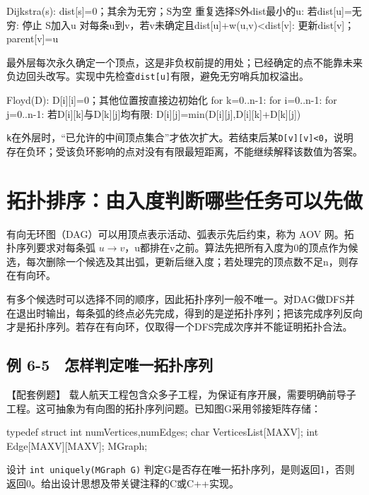 \begin{codeblock}[language={}]
Dijkstra(s):
    dist[s]=0；其余为无穷；S为空
    重复选择S外dist最小的u:
        若dist[u]=无穷: 停止
        S加入u
        对每条u到v，若v未确定且dist[u]+w(u,v)<dist[v]:
            更新dist[v]；parent[v]=u
\end{codeblock}

最外层每次永久确定一个顶点，这是非负权前提的用处；已经确定的点不能靠未来负边回头改写。实现中先检查\texttt{dist[u]}有限，避免无穷哨兵加权溢出。

\begin{codeblock}[language={}]
Floyd(D):
    D[i][i]=0；其他位置按直接边初始化
    for k=0..n-1:
        for i=0..n-1:
            for j=0..n-1:
                若D[i][k]与D[k][j]均有限:
                    D[i][j]=min(D[i][j],D[i][k]+D[k][j])
\end{codeblock}

\texttt{k}在外层时，``已允许的中间顶点集合''才依次扩大。若结束后某\texttt{D[v][v]<\allowbreak{}0}，说明存在负环；受该负环影响的点对没有有限最短距离，不能继续解释该数值为答案。

\section{拓扑排序：由入度判断哪些任务可以先做}\label{DS06-08}

有向无环图（DAG）可以用顶点表示活动、弧表示先后约束，称为 AOV 网。拓扑序列要求对每条弧 \(u\to v\)，u都排在v之前。算法先把所有入度为0的顶点作为候选，每次删除一个候选及其出弧，更新后继入度；若处理完的顶点数不足n，则存在有向环。

有多个候选时可以选择不同的顺序，因此拓扑序列一般不唯一。对DAG做DFS并在退出时输出，每条弧的终点必先完成，得到的是逆拓扑序列；把该完成序列反向才是拓扑序列。若存在有向环，仅取得一个DFS完成次序并不能证明拓扑合法。

\subsection{例 6-5　怎样判定唯一拓扑序列}\label{DS06-ex5}

\begin{example}[配套案例]

【配套例题】 载人航天工程包含众多子工程，为保证有序开展，需要明确前导子工程。这可抽象为有向图的拓扑序列问题。已知图G采用邻接矩阵存储：

\begin{codeblock}[language=C]
typedef struct {
    int numVertices,numEdges;
    char VerticesList[MAXV];
    int Edge[MAXV][MAXV];
} MGraph;
\end{codeblock}

设计 \texttt{int uniquely(\allowbreak{}MGraph G)\allowbreak{}} 判定G是否存在唯一拓扑序列，是则返回1，否则返回0。给出设计思想及带关键注释的C或C++实现。

\end{example}

